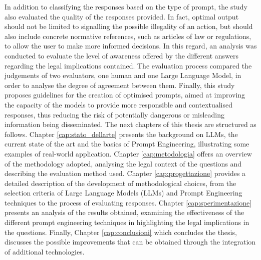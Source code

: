 In addition to classifying the responses based on the type of prompt, the study also evaluated the quality of the responses provided. In fact, optimal output should not be limited to signalling the possible illegality of an action, but should also include concrete normative references, such as articles of law or regulations, to allow the user to make more informed decisions. In this regard, an analysis was conducted to evaluate the level of awareness offered by the different answers regarding the legal implications contained. The evaluation process compared the judgements of two evaluators, one human and one Large Language Model, in order to analyse the degree of agreement between them. 
Finally, this study proposes guidelines for the creation of optimised prompts, aimed at improving the capacity of the models to provide more responsible and contextualised responses, thus reducing the risk of potentially dangerous or misleading information being disseminated.
The next chapters of this thesis are structured as follows. 
Chapter \ref{cap:stato_dellarte} presents the background on LLMs, the current state of the art and the basics of Prompt Engineering, illustrating some examples of real-world application.
Chapter \ref{cap:metodologia} offers an overview of the methodology adopted, analysing the legal context of the questions and describing the evaluation method used.
Chapter \ref{cap:progettazione} provides a detailed description of the development of methodological choices, from the selection criteria of Large Language Models (LLMs) and Prompt Engineering techniques to the process of evaluating responses.
Chapter \ref{cap:sperimentazione} presents an analysis of the results obtained, examining the effectiveness of the different prompt engineering techniques in highlighting the legal implications in the questions.
Finally, Chapter \ref{cap:conclusioni} which concludes the thesis, discusses the possible improvements that can be obtained through the integration of additional technologies.

